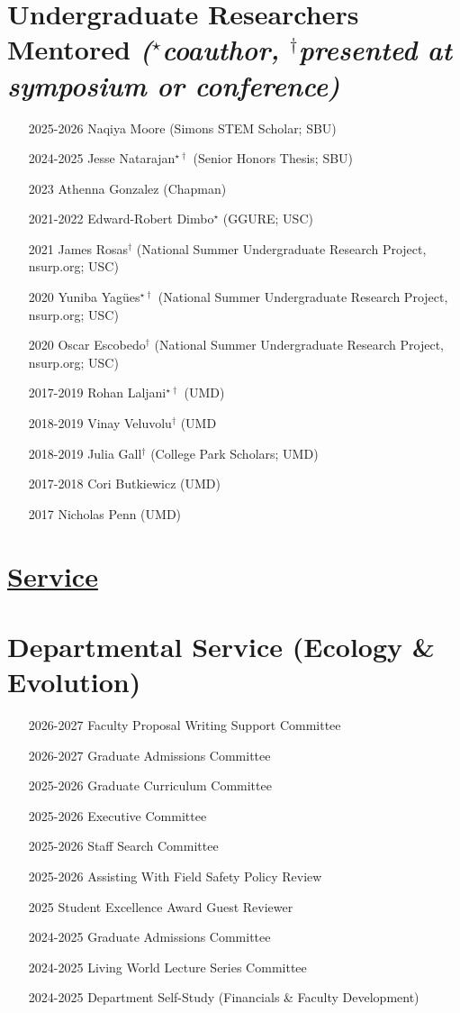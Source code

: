 \documentclass[]{res}
\begin{document}
\begin{resume}
\section{Undergraduate Researchers Mentored \emph{\footnotesize{($^{\star}$coauthor, $^{\dagger}$presented at symposium or conference)}}} 
\begin{itemize}
\item[2025-2026] Naqiya Moore (Simons STEM Scholar; SBU)
\item[2024-2025] Jesse Natarajan$^{\star\dagger}$ (Senior Honors Thesis; SBU)
\item[2023] Athenna Gonzalez (Chapman)
\item[2021-2022] Edward-Robert Dimbo$^{\star}$ (GGURE; USC)
\item[2021] James Rosas$^{\dagger}$ (National Summer Undergraduate Research Project, nsurp.org; USC)
\item[2020] Yuniba Yag{\"u}es$^{\star\dagger}$ (National Summer Undergraduate Research Project, nsurp.org; USC)
\item[2020] Oscar Escobedo$^{\dagger}$ (National Summer Undergraduate Research Project, nsurp.org; USC)
\item[2017-2019] Rohan Laljani$^{\star\dagger}$ (UMD)
\item[2018-2019] Vinay Veluvolu$^{\dagger}$ (UMD
\item[2018-2019] Julia Gall$^{\dagger}$ (College Park Scholars; UMD)
\item[2017-2018] Cori Butkiewicz (UMD)
\item[2017] Nicholas Penn (UMD)
\end{itemize}

\section{\underline{Service}}

\section{{Departmental Service (Ecology \& Evolution)}} 
\begin{itemize}
\item[2026-2027] {Faculty Proposal Writing Support Committee} 
\item[2026-2027] {Graduate Admissions Committee} 
\item[2025-2026] {Graduate Curriculum Committee} 
\item[2025-2026] {Executive Committee} 
\item[2025-2026] {Staff Search Committee} 
\item[2025-2026] {Assisting With Field Safety Policy Review} 
\item[2025] {Student Excellence Award Guest Reviewer} 
\item[2024-2025] {Graduate Admissions Committee} 
\item[2024-2025] {Living World Lecture Series Committee} 
\item[2024-2025] {Department Self-Study (Financials \& Faculty Development)} 
\end{itemize}


\end{resume}
\end{document}
